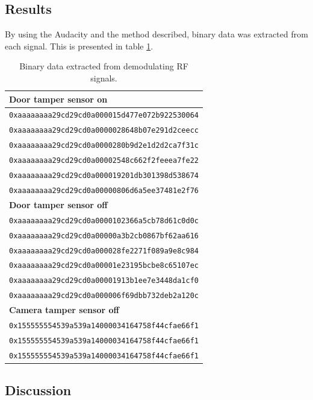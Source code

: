\subsection{Results}
By using the Audacity and the method described, binary data was extracted from each signal. This is presented in table \ref{tb:demodulated-data}.
\begin{table}[!ht]
    \centering
    \begin{tabularx}{\textwidth}{l}
        \hline
        \textbf{Door tamper sensor on} \\ \hline
        \texttt{0xaaaaaaaa29cd29cd0a000015d477e072b922530064} \\
        \texttt{0xaaaaaaaa29cd29cd0a0000028648b07e291d2ceecc} \\
        \texttt{0xaaaaaaaa29cd29cd0a0000280b9d2e1d2d2ca7f31c} \\
        \texttt{0xaaaaaaaa29cd29cd0a00002548c662f2feeea7fe22} \\
        \texttt{0xaaaaaaaa29cd29cd0a000019201db301398d538674} \\
        \texttt{0xaaaaaaaa29cd29cd0a00000806d6a5ee37481e2f76} \\
        \hline
        
        \textbf{Door tamper sensor off} \\ \hline
        \texttt{0xaaaaaaaa29cd29cd0a0000102366a5cb78d61c0d0c} \\
        \texttt{0xaaaaaaaa29cd29cd0a00000a3b2cb0867bf62aa616} \\
        \texttt{0xaaaaaaaa29cd29cd0a000028fe2271f089a9e8c984} \\
        \texttt{0xaaaaaaaa29cd29cd0a00001e23195bcbe8c65107ec} \\
        \texttt{0xaaaaaaaa29cd29cd0a00001913b1ee7e3448da1cf0} \\
        \texttt{0xaaaaaaaa29cd29cd0a000006f69dbb732deb2a120c} \\
        \hline
        
        \textbf{Camera tamper sensor off} \\ \hline
        \texttt{0x155555554539a539a14000034164758f44cfae66f1} \\
        \texttt{0x155555554539a539a14000034164758f44cfae66f1} \\
        \texttt{0x155555554539a539a14000034164758f44cfae66f1} \\
        \hline
    \end{tabularx}
    \caption{Binary data extracted from demodulating RF signals.}
    \label{tb:demodulated-data}
\end{table}

\subsection{Discussion}
\todo
